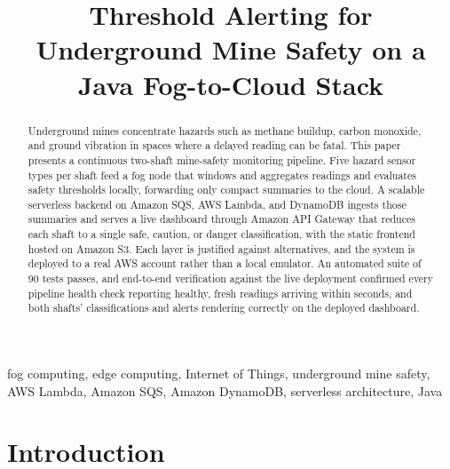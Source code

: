 \documentclass[conference]{IEEEtran}
\begin{document}
\title{Threshold Alerting for Underground Mine Safety on a Java Fog-to-Cloud Stack}

\author{
}

\maketitle

\begin{abstract}
Underground mines concentrate hazards such as methane buildup, carbon monoxide, and ground vibration in spaces where a delayed reading can be fatal. This paper presents a continuous two-shaft mine-safety monitoring pipeline. Five hazard sensor types per shaft feed a fog node that windows and aggregates readings and evaluates safety thresholds locally, forwarding only compact summaries to the cloud. A scalable serverless backend on Amazon SQS, AWS Lambda, and DynamoDB ingests those summaries and serves a live dashboard through Amazon API Gateway that reduces each shaft to a single safe, caution, or danger classification, with the static frontend hosted on Amazon S3. Each layer is justified against alternatives, and the system is deployed to a real AWS account rather than a local emulator. An automated suite of 90 tests passes, and end-to-end verification against the live deployment confirmed every pipeline health check reporting healthy, fresh readings arriving within seconds, and both shafts' classifications and alerts rendering correctly on the deployed dashboard.
\end{abstract}

\begin{IEEEkeywords}
fog computing, edge computing, Internet of Things, underground mine safety, AWS Lambda, Amazon SQS, Amazon DynamoDB, serverless architecture, Java
\end{IEEEkeywords}

\section{Introduction}
\end{document}
